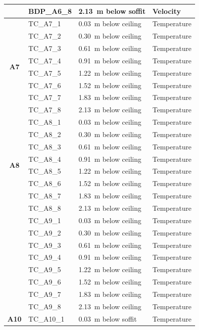 \documentclass[12pt,oneside]{book}
\begin{document}
\begin{longtable}[c]{c|lll}
 & BDP\_A6\_8 & 2.13~m below soffit  & Velocity \\
\midrule
\multirow{8}{*}{\large{\textbf{A7}}}
 & TC\_A7\_1  & 0.03~m below ceiling & Temperature \\
 & TC\_A7\_2  & 0.30~m below ceiling & Temperature \\
 & TC\_A7\_3  & 0.61~m below ceiling & Temperature \\
 & TC\_A7\_4  & 0.91~m below ceiling & Temperature \\
 & TC\_A7\_5  & 1.22~m below ceiling & Temperature \\
 & TC\_A7\_6  & 1.52~m below ceiling & Temperature \\
 & TC\_A7\_7  & 1.83~m below ceiling & Temperature \\
 & TC\_A7\_8  & 2.13~m below ceiling & Temperature \\
\midrule
\multirow{8}{*}{\large{\textbf{A8}}}
 & TC\_A8\_1  & 0.03~m below ceiling & Temperature \\
 & TC\_A8\_2  & 0.30~m below ceiling & Temperature \\
 & TC\_A8\_3  & 0.61~m below ceiling & Temperature \\
 & TC\_A8\_4  & 0.91~m below ceiling & Temperature \\
 & TC\_A8\_5  & 1.22~m below ceiling & Temperature \\
 & TC\_A8\_6  & 1.52~m below ceiling & Temperature \\
 & TC\_A8\_7  & 1.83~m below ceiling & Temperature \\
 & TC\_A8\_8  & 2.13~m below ceiling & Temperature \\
\bottomrule
\newpage
\multirow{8}{*}{\large{\textbf{A9}}}
 & TC\_A9\_1  & 0.03~m below ceiling & Temperature \\
 & TC\_A9\_2  & 0.30~m below ceiling & Temperature \\
 & TC\_A9\_3  & 0.61~m below ceiling & Temperature \\
 & TC\_A9\_4  & 0.91~m below ceiling & Temperature \\
 & TC\_A9\_5  & 1.22~m below ceiling & Temperature \\
 & TC\_A9\_6  & 1.52~m below ceiling & Temperature \\
 & TC\_A9\_7  & 1.83~m below ceiling & Temperature \\
 & TC\_A9\_8  & 2.13~m below ceiling & Temperature \\
\midrule
\multirow{19}{*}{\large\textbf{A10}} 
 & TC\_A10\_1  & 0.03~m below soffit & Temperature \\

\end{longtable}
\end{document}
